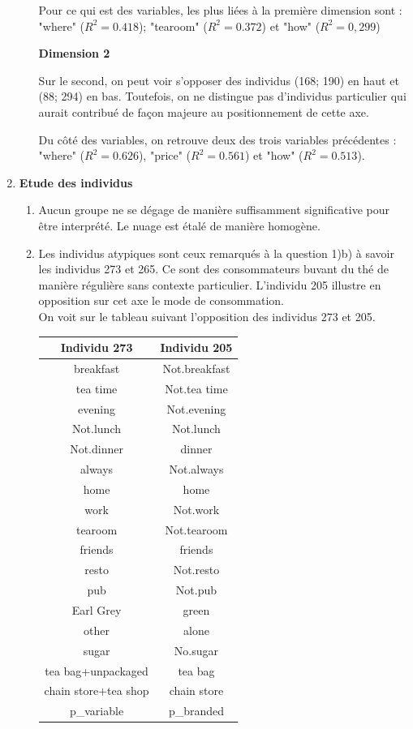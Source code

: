 \documentclass{article}
\begin{document}
\begin{enumerate}
\begin{enumerate}
Pour ce qui est des variables, les plus liées à la première dimension sont : "where" ($R^2=0.418$); "tearoom" ($R^2=0.372$) et "how" ($R^2=0,299$)


\textbf{Dimension 2}

Sur le second, on peut voir s'opposer des individus (168; 190)  en haut et (88; 294) en bas. Toutefois, on ne distingue pas d'individus particulier qui aurait contribué de façon majeure au positionnement de cette axe.

Du côté des variables, on retrouve deux des trois variables précédentes : "where" ($R^2=0.626$), "price" ($R^2= 0.561$) et "how" ($R^2=0.513$).
	\end{enumerate}
	
\item \textbf{Etude des individus}
	\begin{enumerate}
	\item Aucun groupe ne se dégage de manière suffisamment significative pour être interprété. Le nuage est étalé de manière homogène.
	\item Les individus atypiques sont ceux remarqués à la question 1)b) à savoir les individus 273 et 265. Ce sont des consommateurs buvant du thé de manière régulière sans contexte particulier. L'individu 205 illustre en opposition sur cet axe le mode de consommation.\\
	
On voit sur le tableau suivant l'opposition des individus 273 et 205.
	
\begin{center}
\begin{tabular}{|c|c|}
\hline
Individu 273 &  Individu 205 \\
\hline
breakfast & Not.breakfast\\
\hline
tea time & Not.tea time\\
\hline
evening & Not.evening\\
\hline
Not.lunch & Not.lunch\\
\hline
Not.dinner & dinner\\
\hline
always & Not.always\\
\hline
home & home\\
\hline
work & Not.work\\
\hline
tearoom & Not.tearoom\\
\hline
friends & friends \\
\hline
resto & Not.resto \\
\hline
pub & Not.pub \\
\hline
Earl Grey & green \\
\hline
other & alone \\
\hline
sugar & No.sugar \\
\hline
tea bag+unpackaged & tea bag \\
\hline
chain store+tea shop & chain store \\
\hline
p\_variable & p\_branded\\
\hline
\end{tabular}


\end{center}
\end{enumerate}
\end{enumerate}
\end{document}

